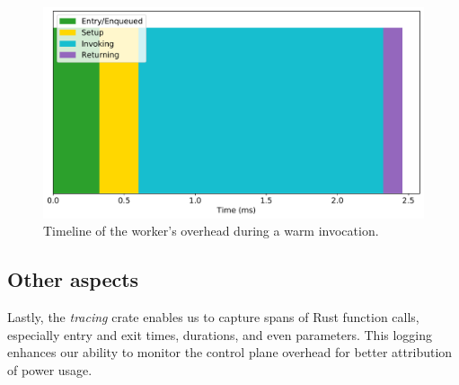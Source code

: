 \begin{figure}
    \includegraphics[width=\columnwidth]{../graphs/timelines/1-625b2e-simple-timeline.pdf}
    \caption{Timeline of the \sysname{} worker's overhead during a warm invocation.}
\end{figure}


\subsection{Other aspects}
Lastly, the \emph{tracing} crate enables us to capture spans of Rust function calls, especially entry and exit times, durations, and even parameters.
This logging enhances our ability to monitor the control plane overhead for better attribution of power usage.


